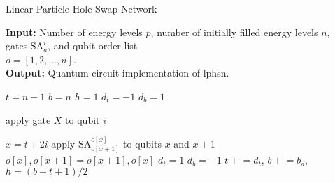\documentclass[10pt]{article}
\begin{document}
\begin{algorithm}[H]

\caption{Linear Particle-Hole Swap Network}\label{lphsn}

\hspace*{\algorithmicindent} \textbf{Input:} Number of energy levels $p$, number of initially  filled energy levels $n$,
\\
\hspace*{\algorithmicindent} gates $\text{SA}^i_a$, and qubit order list
\\
\hspace*{\algorithmicindent} $o=[1,2,...,n]$.
\\
\hspace*{\algorithmicindent} \textbf{Output:} Quantum circuit implementation of lphsn.

\begin{algorithmic}[H]

\State $t = n - 1$ 
\State $b = n$ 
\State $h = 1$ 
\State $d_t = -1$ 
\State $d_b = 1$ 

    \State apply gate $X$ to qubit $i$
\EndFor

        \State $x=t+2i$
        \State apply $\text{SA}^{o[x]}_{o[x+1]}$ to qubits $x$ and $x+1$
        \State $o[x], o[x+1] = o[x+1], o[x]$
    \EndFor
        \State $d_t = 1$
    \EndIf
        \State $d_b = -1$
    \EndIf
    \State $t\mathrel{+}=d_t$, $b\mathrel{+}=b_d$, $h = (b-t+1)/2$
\EndWhile
\end{algorithmic}

\end{algorithm}
\end{document}
